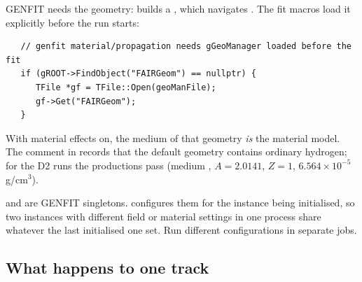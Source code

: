 GENFIT needs the geometry:  builds a , which navigates
. The fit macros load it explicitly before the run starts:
\begin{verbatim}
   // genfit material/propagation needs gGeoManager loaded before the fit
   if (gROOT->FindObject("FAIRGeom") == nullptr) {
      TFile *gf = TFile::Open(geoManFile);
      gf->Get("FAIRGeom");
   }
\end{verbatim}
With material effects on, the medium of that geometry \emph{is} the material model. The comment in
 records that the default geometry  contains
ordinary hydrogen; for the D2 runs the productions pass  (medium
, $A=2.0141$, $Z=1$, $6.564\times10^{-5}$\,g/cm$^3$).

 and  are GENFIT singletons.  configures them for the instance
being initialised, so two  instances with different field or material settings in one process
share whatever the last initialised one set. Run different configurations in separate jobs.

\subsection{What happens to one track}
\label{sec:gf-steps}

